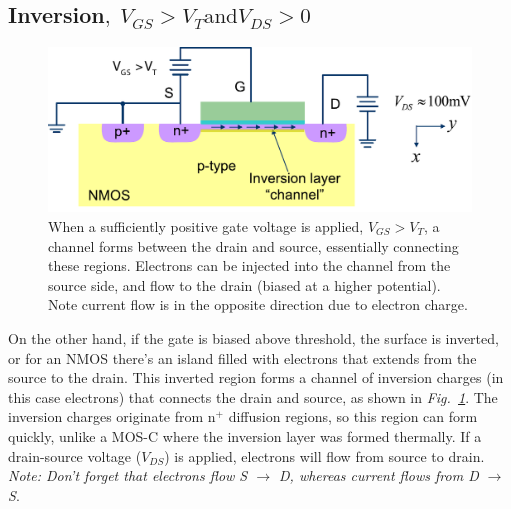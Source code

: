 \subsection{Inversion\texorpdfstring{$,\;V_{GS}>V_T\text{and}V_{DS}>0$}{}}
\begin{figure}[tb]
\centering
\includegraphics[width=.75\columnwidth]{mos_triode}
\caption{When a sufficiently positive gate voltage is applied, $V_{GS} > V_T$, a channel forms between the drain and source, essentially connecting these regions.  Electrons can be injected into the channel from the source side, and flow to the drain (biased at a higher potential).  Note current flow is in the opposite direction due to electron charge.}
\label{fig:mos_triode}
\end{figure}
On the other hand, if the gate is biased above threshold, the surface is inverted, or for an NMOS there's an island filled with electrons that extends from the source to the drain.   This inverted region forms a channel of inversion charges (in this case electrons) that connects the drain and source, as shown in \emph{Fig.~\ref{fig:mos_triode}}.  The inversion charges originate from n$^+$ diffusion regions, so this region can form quickly, unlike a MOS-C where the inversion layer was formed thermally. If a drain-source voltage ($V_{DS}$) is applied, electrons will flow from source to drain.  
 \textit{Note: Don't forget that electrons flow S $\rightarrow$ D, whereas current flows from D $\rightarrow$ S}.
